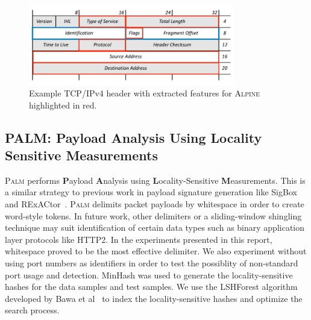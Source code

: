 \begin{figure} [ht!]
  \centering
  \includegraphics[width=0.8\textwidth]{chapters/4/img/alpineheader.png}
  \caption{Example TCP/IPv4 header with extracted features for \textsc{Alpine} highlighted in red.}
  \label{fig:f1compare}
\end{figure}

\subsection{PALM: Payload Analysis Using Locality Sensitive Measurements}
\textsc{Palm} performs \textbf{P}ayload \textbf{A}nalysis using \textbf{L}ocality-Sensitive \textbf{M}easurements. This is a similar strategy to previous work in payload signature generation like SigBox~\cite{Shim2017SigBoxAS} and RExACtor~\cite{rexactor}. \textsc{Palm} delimits packet payloads by whitespace in order to create word-style tokens. In future work, other delimiters or a sliding-window shingling technique may suit identification of certain data types such as binary application layer protocols like HTTP2. In the experiments presented in this report, whitespace proved to be the most effective delimiter. We also experiment without using port numbers as identifiers in order to test the possiblity of non-standard port usage and detection. MinHash was used to generate the locality-sensitive hashes for the data samples and test samples. We use the LSHForest algorithm developed by Bawa et al~\cite{lshforest} to index the locality-sensitive hashes and optimize the search process. 
